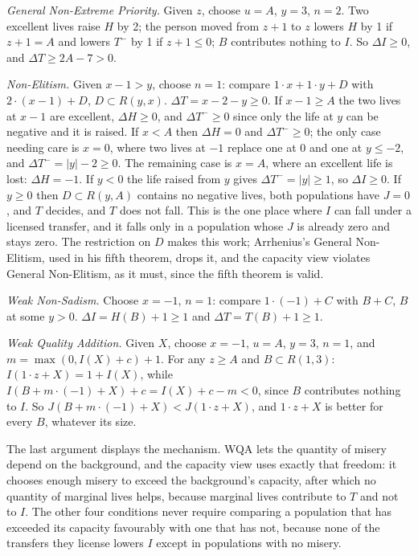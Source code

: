 \documentclass[
  11pt,
  letterpaper,
  DIV=11,
  numbers=noendperiod,
  twoside]{scrartcl}
\newcounter{none} %
\begin{document}
\emph{General Non-Extreme Priority.} Given \(z\), choose \(u = A\),
\(y = 3\), \(n = 2\). Two excellent lives raise \(H\) by 2; the person
moved from \(z+1\) to \(z\) lowers \(H\) by 1 if \(z + 1 = A\) and
lowers \(T^-\) by 1 if \(z + 1 \leq 0\); \(B\) contributes nothing to
\(I\). So \(\Delta I \geq 0\), and \(\Delta T \geq 2A - 7 > 0\).

\emph{Non-Elitism.} Given \(x - 1 > y\), choose \(n = 1\): compare
\(1\cdot x + 1 \cdot y + D\) with \(2 \cdot (x-1) + D\),
\(D \subset R(y,x)\). \(\Delta T = x - 2 - y \geq 0\). If
\(x - 1 \geq A\) the two lives at \(x-1\) are excellent,
\(\Delta H \geq 0\), and \(\Delta T^- \geq 0\) since only the life at
\(y\) can be negative and it is raised. If \(x < A\) then
\(\Delta H = 0\) and \(\Delta T^- \geq 0\); the only case needing care
is \(x = 0\), where two lives at \(-1\) replace one at 0 and one at
\(y \leq -2\), and \(\Delta T^- = |y| - 2 \geq 0\). The remaining case
is \(x = A\), where an excellent life is lost: \(\Delta H = -1\). If
\(y < 0\) the life raised from \(y\) gives \(\Delta T^- = |y| \geq 1\),
so \(\Delta I \geq 0\). If \(y \geq 0\) then \(D \subset R(y, A)\)
contains no negative lives, both populations have \(J = 0\), and \(T\)
decides, and \(T\) does not fall. This is the one place where \(I\) can
fall under a licensed transfer, and it falls only in a population whose
\(J\) is already zero and stays zero. The restriction on \(D\) makes
this work; Arrhenius's General Non-Elitism, used in his fifth theorem,
drops it, and the capacity view violates General Non-Elitism, as it
must, since the fifth theorem is valid.

\emph{Weak Non-Sadism.} Choose \(x = -1\), \(n = 1\): compare
\(1 \cdot (-1) + C\) with \(B + C\), \(B\) at some \(y > 0\).
\(\Delta I = H(B) + 1 \geq 1\) and \(\Delta T = T(B) + 1 \geq 1\).

\emph{Weak Quality Addition.} Given \(X\), choose \(x = -1\), \(u = A\),
\(y = 3\), \(n = 1\), and \(m = \max(0, I(X) + c) + 1\). For any
\(z \geq A\) and \(B \subset R(1,3)\): \(I(1 \cdot z + X) = 1 + I(X)\),
while \(I(B + m \cdot (-1) + X) + c = I(X) + c - m < 0\), since \(B\)
contributes nothing to \(I\). So
\(J(B + m\cdot(-1) + X) < J(1 \cdot z + X)\), and \(1 \cdot z + X\) is
better for every \(B\), whatever its size.

The last argument displays the mechanism. WQA lets the quantity of
misery depend on the background, and the capacity view uses exactly that
freedom: it chooses enough misery to exceed the background's capacity,
after which no quantity of marginal lives helps, because marginal lives
contribute to \(T\) and not to \(I\). The other four conditions never
require comparing a population that has exceeded its capacity favourably
with one that has not, because none of the transfers they license lowers
\(I\) except in populations with no misery.
\end{document}
